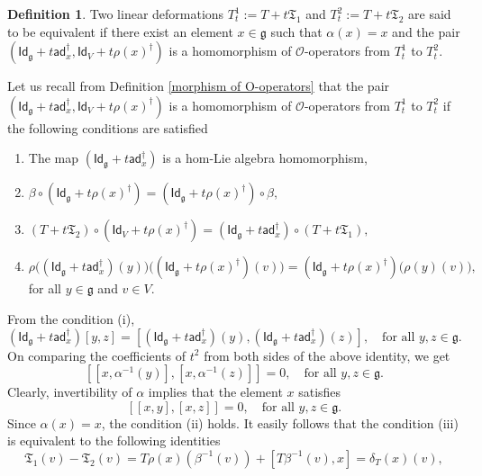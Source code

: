 \documentclass[a4paper,11pt]{amsart}
\theoremstyle{plain}
\theoremstyle{definition}
\newtheorem{definition}[theorem]{Definition}
\theoremstyle{remark}
\numberwithin{equation}{section}
\begin{document}
\begin{definition}
Two linear deformations $T_t^1:=T+t\mathfrak{T}_1$ and $T_t^2:=T+t\mathfrak{T}_2$ are said to be equivalent if there exist an element $x\in \mathfrak{g}$ such that $\alpha(x)=x$ and the pair $(\mathsf{Id}_{\mathfrak{g}}+t\mathsf{ad}^\dagger_x,\mathsf{Id}_V+t\rho(x)^\dagger)$ is a homomorphism of $\mathcal{O}$-operators from $T_t^1$ to $T_t^2$. 
\end{definition}
Let us recall from Definition \ref{morphism of O-operators} that the pair $(\mathsf{Id}_{\mathfrak{g}}+t\mathsf{ad}^\dagger_x,\mathsf{Id}_V+t\rho(x)^\dagger)$ is a homomorphism of $\mathcal{O}$-operators from $T_t^1$ to $T_t^2$ if the following conditions are satisfied
\begin{enumerate}[label=(\roman*)]
\item The map $(\mathsf{Id}_{\mathfrak{g}}+t\mathsf{ad}^\dagger_x)$ is a hom-Lie algebra homomorphism,
\item $\beta\circ(\mathsf{Id}_{\mathfrak{g}}+t\rho(x)^\dagger)=(\mathsf{Id}_{\mathfrak{g}}+t\rho(x)^\dagger)\circ\beta,$ 
\item $(T+t\mathfrak{T}_2)\circ(\mathsf{Id}_V+t\rho(x)^\dagger)=(\mathsf{Id}_{\mathfrak{g}}+t\mathsf{ad}_x^\dagger)\circ(T+t\mathfrak{T}_1),$ 
\item $\rho\big((\mathsf{Id}_{\mathfrak{g}}+t\mathsf{ad}_x^\dagger)(y)\big)\big((\mathsf{Id}_{\mathfrak{g}}+t\rho(x)^\dagger)(v)\big)=(\mathsf{Id}_{\mathfrak{g}}+t\rho(x)^\dagger)\big(\rho(y)(v)\big),$ for all $y\in \mathfrak{g}$ and $v\in V$.
\end{enumerate}
From the condition (i), 
$$(\mathsf{Id}_{\mathfrak{g}}+t\mathsf{ad}_x^\dagger)[y,z]=[(\mathsf{Id}_{\mathfrak{g}}+t\mathsf{ad}_x^\dagger)(y),(\mathsf{Id}_{\mathfrak{g}}+t\mathsf{ad}_x^\dagger)(z)],\quad\mbox{for all }y,z\in \mathfrak{g}.$$
On comparing the coefficients of $t^2$ from both sides of the above identity, we get 
$$[[x,\alpha^{-1}(y)],[x,\alpha^{-1}(z)]]=0,\quad\mbox{for all }y,z\in\mathfrak{g}.$$ 
Clearly, invertibility of $\alpha$ implies that the element $x$ satisfies
\begin{equation}\label{equ-linear:cond1}
[[x,y],[x,z]]=0,\quad\mbox{for all }y,z\in\mathfrak{g}.
\end{equation}
Since $\alpha(x)=x$, the condition (ii) holds. It easily follows that the condition (iii) is equivalent to the following identities
\begin{equation}\label{equ-linear:cond2}
\mathfrak{T}_1(v)-\mathfrak{T}_2(v)=T\rho(x)(\beta^{-1}(v))+[T\beta^{-1}(v),x]=\delta_T(x)(v),
\end{equation}
\end{document}
